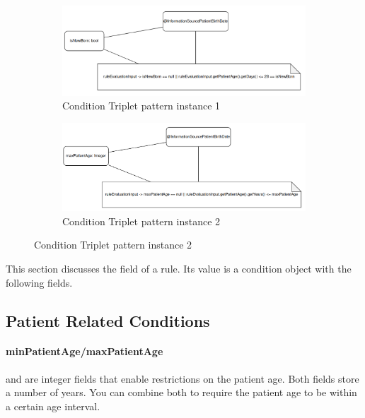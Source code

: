 \begin{figure}
    \centering
    \begin{subfigure}[b]{0.45\linewidth}
        \centering
        \includegraphics[width=\linewidth]{./figures/ctp-is-new-born}
        \caption{Condition Triplet pattern instance 1}
        \label{fig:condition-triplet-pattern-instance-1}
    \end{subfigure}
    \hspace{5mm} %
    \begin{subfigure}[b]{0.45\linewidth}
        \centering
        \includegraphics[width=\linewidth]{./figures/ctp-max-patient-age}
        \caption{Condition Triplet pattern instance 2}
        \label{fig:condition-triplet-pattern-instance-2}
    \end{subfigure}
    \label{fig:coffee}
\end{figure}
This section discusses the  field of a rule.
Its value is a condition object with the following fields.

\subsection{Patient Related Conditions}\label{subsec:patient-related-conditions}

\paragraph{minPatientAge/maxPatientAge}
 and  are integer fields that enable restrictions on the patient age.
Both fields store a number of years.
You can combine both to require the patient age to be within a certain age interval.

